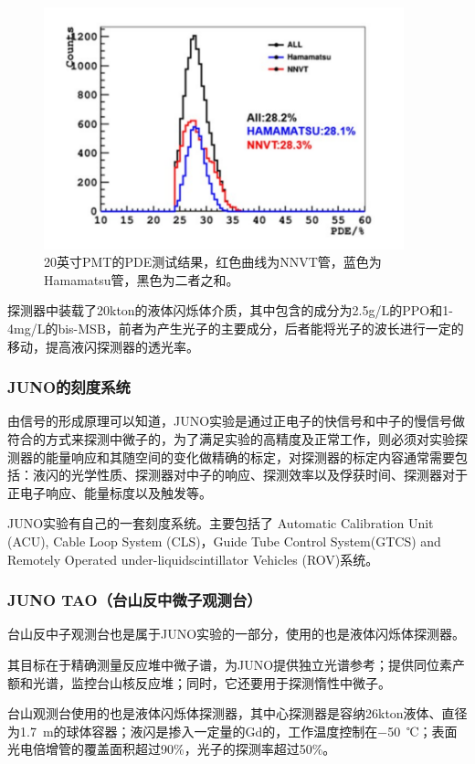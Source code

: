 \documentclass[10pt,a4paper]{article}
\begin{document}
\begin{figure}[ht]
 \centering
 \includegraphics[height=7cm]{images/pmt测试.png}
 \caption{20英寸PMT的PDE测试结果，红色曲线为NNVT管，蓝色为Hamamatsu管，黑色为二者之和。}
 \label{fig:singleblock}
\end{figure}

探测器中装载了20kton的液体闪烁体介质，其中包含的成分为2.5g/L的PPO和1-4mg/L的bis-MSB，前者为产生光子的主要成分，后者能将光子的波长进行一定的移动，提高液闪探测器的透光率。

\subsubsection{JUNO的刻度系统}\label{sub:logicinter}
由信号的形成原理可以知道，JUNO实验是通过正电子的快信号和中子的慢信号做符合的方式来探测中微子的，为了满足实验的高精度及正常工作，则必须对实验探测器的能量响应和其随空间的变化做精确的标定，对探测器的标定内容通常需要包括：液闪的光学性质、探测器对中子的响应、探测效率以及俘获时间、探测器对于正电子响应、能量标度以及触发等。

JUNO实验有自己的一套刻度系统。主要包括了 Automatic Calibration Unit (ACU),
Cable Loop System (CLS)，Guide Tube Control System(GTCS) and Remotely Operated under-liquidscintillator Vehicles (ROV)系统。

\subsubsection{JUNO TAO（台山反中微子观测台）}\label{sub:logicinter}

台山反中子观测台也是属于JUNO实验的一部分，使用的也是液体闪烁体探测器。

其目标在于精确测量反应堆中微子谱，为JUNO提供独立光谱参考；提供同位素产额和光谱，监控台山核反应堆；同时，它还要用于探测惰性中微子。

台山观测台使用的也是液体闪烁体探测器，其中心探测器是容纳26kton液体、直径为\SI{1.7}{m}的球体容器；液闪是掺入一定量的Gd的，工作温度控制在\SI{-50}{℃}；表面光电倍增管的覆盖面积超过90\%，光子的探测率超过50\%。
\end{document}
